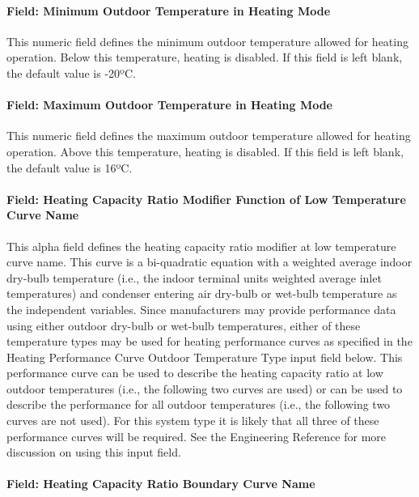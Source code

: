 \paragraph{Field: Minimum Outdoor Temperature in Heating Mode}\label{field-minimum-outdoor-temperature-in-heating-mode-000}

This numeric field defines the minimum outdoor temperature allowed for heating operation. Below this temperature, heating is disabled. If this field is left blank, the default value is -20ºC.

\paragraph{Field: Maximum Outdoor Temperature in Heating Mode}\label{field-maximum-outdoor-temperature-in-heating-mode-000}

This numeric field defines the maximum outdoor temperature allowed for heating operation. Above this temperature, heating is disabled. If this field is left blank, the default value is 16ºC.

\paragraph{Field: Heating Capacity Ratio Modifier Function of Low Temperature Curve Name}\label{field-heating-capacity-ratio-modifier-function-of-low-temperature-curve-name}

This alpha field defines the heating capacity ratio modifier at low temperature curve name. This curve is a bi-quadratic equation with a weighted average indoor dry-bulb temperature (i.e., the indoor terminal units weighted average inlet temperatures) and condenser entering air dry-bulb or wet-bulb temperature as the independent variables. Since manufacturers may provide performance data using either outdoor dry-bulb or wet-bulb temperatures, either of these temperature types may be used for heating performance curves as specified in the Heating Performance Curve Outdoor Temperature Type input field below. This performance curve can be used to describe the heating capacity ratio at low outdoor temperatures (i.e., the following two curves are used) or can be used to describe the performance for all outdoor temperatures (i.e., the following two curves are not used). For this system type it is likely that all three of these performance curves will be required. See the Engineering Reference for more discussion on using this input field.

\paragraph{Field: Heating Capacity Ratio Boundary Curve Name}\label{field-heating-capacity-ratio-boundary-curve-name}

